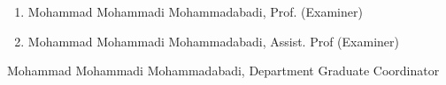 \begin{latin}
\begin{enumerate}
\item Mohammad Mohammadi Mohammadabadi, Prof. (Examiner)
\vspace{0.5cm}

\item Mohammad Mohammadi Mohammadabadi, Assist. Prof (Examiner)
\vspace{0.5cm}

\end{enumerate}

Mohammad Mohammadi Mohammadabadi, Department Graduate Coordinator

\pagebreak
\end{latin}

\thispagestyle{empty}
\mbox{}

